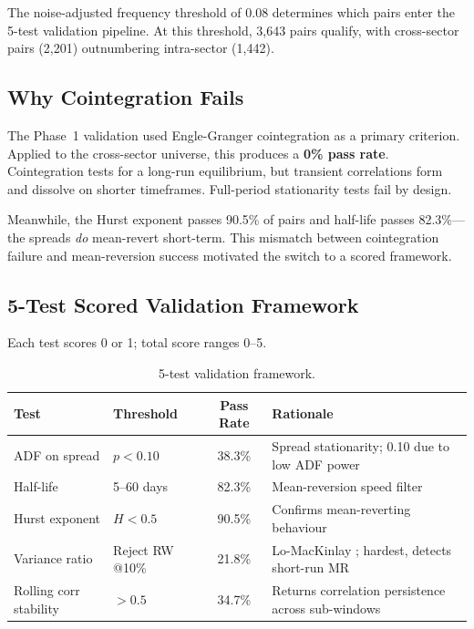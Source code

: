 \documentclass[11pt, a4paper]{article}
\begin{document}
The noise-adjusted frequency threshold of 0.08 determines which pairs enter the 5-test validation pipeline. At this threshold, 3,643 pairs qualify, with cross-sector pairs (2,201) outnumbering intra-sector (1,442).

\subsection{Why Cointegration Fails}

The Phase~1 validation used Engle-Granger cointegration as a primary criterion. Applied to the cross-sector universe, this produces a \textbf{0\% pass rate}. Cointegration tests for a long-run equilibrium, but transient correlations form and dissolve on shorter timeframes. Full-period stationarity tests fail by design.

Meanwhile, the Hurst exponent passes 90.5\% of pairs and half-life passes 82.3\%---the spreads \textit{do} mean-revert short-term. This mismatch between cointegration failure and mean-reversion success motivated the switch to a scored framework.

\subsection{5-Test Scored Validation Framework}

Each test scores 0 or 1; total score ranges 0--5.

\begin{table}[H]
\centering
\caption{5-test validation framework.}
\begin{tabular}{@{}llcl@{}}
\toprule
\textbf{Test} & \textbf{Threshold} & \textbf{Pass Rate} & \textbf{Rationale} \\
\midrule
ADF on spread \cite{dickey1979} & $p < 0.10$ & 38.3\% & Spread stationarity; 0.10 due to low ADF power \\
Half-life             & 5--60 days     & 82.3\% & Mean-reversion speed filter \\
Hurst exponent        & $H < 0.5$      & 90.5\% & Confirms mean-reverting behaviour \\
Variance ratio        & Reject RW @10\% & 21.8\% & Lo-MacKinlay \cite{lomackinlay1988}; hardest, detects short-run MR \\
Rolling corr stability & $> 0.5$       & 34.7\% & Returns correlation persistence across sub-windows \\
\bottomrule
\end{tabular}
\label{tab:5test}
\end{table}
\end{document}
